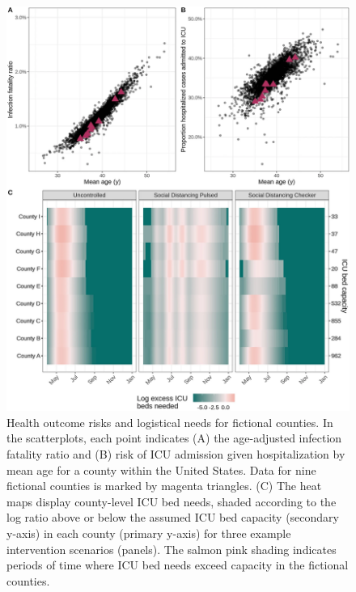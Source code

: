 {\begin{figure}[!htb]%
    \centering
    \includegraphics{fig_pipeline/fig3a}
    \caption[Health outcome risks and logistical needs for fictional counties]{Health outcome risks and logistical needs for fictional counties. In the scatterplots, each point indicates (A) the age-adjusted infection fatality ratio and (B) risk of ICU admission given hospitalization by mean age for a county within the United States. Data for nine fictional counties is marked by magenta triangles. (C) The heat maps display county-level ICU bed needs, shaded according to the log ratio above or below the assumed ICU bed capacity (secondary y-axis) in each county (primary y-axis) for three example intervention scenarios (panels). The salmon pink shading indicates periods of time where ICU bed needs exceed capacity in the fictional counties.}
    \label{fig:pipeline-outcome}
\end{figure}

}

